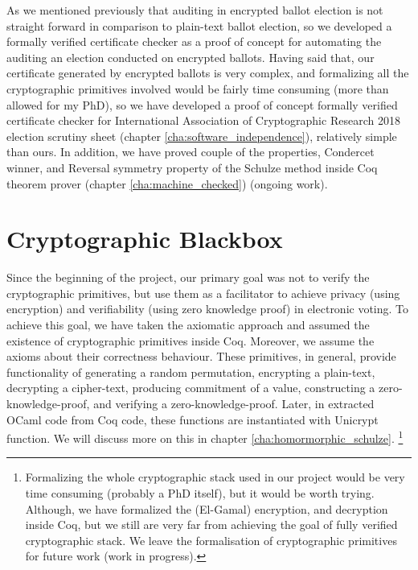 As we mentioned previously that auditing in encrypted ballot election is not straight forward 
in comparison to plain-text ballot election, so we developed a formally verified 
certificate checker as a proof of concept for automating the auditing an election conducted on encrypted ballots. 
Having said that,  our certificate generated by encrypted ballots is very complex, and formalizing all the cryptographic 
primitives involved would be 
 fairly time consuming (more than allowed for my PhD), so we have developed a proof of concept 
formally verified certificate checker for International Association of Cryptographic Research 2018 election
scrutiny sheet (chapter \ref{cha:software_independence}), relatively simple than ours. 
In addition, we have proved couple of the properties, Condercet winner, and Reversal symmetry property 
of the Schulze method inside Coq theorem prover (chapter \ref{cha:machine_checked}) (ongoing work).
 

\section{Cryptographic Blackbox}
Since the beginning of the project, our primary goal was not to verify the cryptographic primitives, but use them as a 
facilitator to achieve privacy (using encryption) and verifiability (using zero knowledge proof) in electronic voting. 
To achieve this goal, we have 
taken the axiomatic approach and assumed the existence of cryptographic primitives 
inside Coq. Moreover, we assume the axioms about their correctness behaviour. These primitives, in general, provide functionality 
of generating a random permutation, encrypting a plain-text, decrypting a cipher-text, 
producing commitment of a value, constructing a zero-knowledge-proof, 
and verifying a zero-knowledge-proof. Later, in extracted OCaml code from Coq code, these functions are instantiated 
with Unicrypt\citep{LocherH14} function.  We will discuss more on this in chapter
\ref{cha:homormorphic_schulze}.
\footnote{Formalizing the whole cryptographic stack used in our 
project would be very time consuming (probably a PhD itself), but it would be worth trying. 
Although, we have formalized the (El-Gamal) encryption, and decryption inside Coq, but we still 
are very far from achieving the goal of fully verified cryptographic stack.  We leave the formalisation 
of cryptographic primitives for future work (work in progress).}



